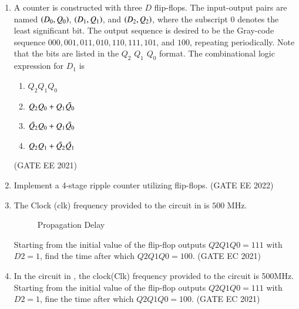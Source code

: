 \begin{enumerate}[label=\arabic*.,ref=\theenumi]
%
\item A counter is constructed with three $D$ flip-flops. The input-output pairs are named $\left(D_0, Q_0\right)$, $\left(D_1, Q_1\right)$, and $\left(D_2, Q_2\right)$, where the subscript $0$ denotes the least significant bit. The output sequence is desired to be the Gray-code sequence $000, 001, 011, 010, 110, 111, 101$, and $100$, repeating periodically. Note that the bits are listed in the $Q_2$  $Q_1$  $Q_0$ format. The combinational logic expression for $D_1$ is
%
\begin{enumerate}
    \item $Q_2 Q_1 Q_0$
    \item $Q_2 Q_0 + Q_1 \Bar{Q_0}$
    \item $\Bar{Q_2} Q_0 + Q_1 \Bar{Q_0}$
    \item $Q_2 Q_1 + \Bar{Q_2} \Bar{Q_1}$
\end{enumerate}
\hfill(GATE EE 2021)
%
\item Implement a 4-stage ripple counter utilizing flip-flops.
\label{gate-ee-2022-29}
\hfill (GATE EE 2022)
%
\item 
 The Clock (clk) frequency provided to the circuit 
in	
is $500$ MHz.
%
	\begin{figure}[H]
    \centering
    \resizebox{0.75\columnwidth}{!}{%
    
		}
    \caption{Propagation Delay}
	\label{fig:PropagationDelay}
\end{figure}
Starting from the initial value of the flip-flop outputs $Q2Q1Q0 =1 1 1$ with $D2=1$, find the time after which $Q2Q1Q0=1 0 0$. 
\hfill(GATE EC 2021)
%
\item In the circuit in 
	,
\label{prob:gate-ec-46.2021}
the clock(Clk) frequency provided to the circuit is 500MHz.
Starting from the initial value of the flip-flop outputs $Q2Q1Q0 =111$ with $D2=1$, fine the time after which $Q2Q1Q0 = 1 0 0$. 
\hfill (GATE EC 2021)
%
	\begin{figure}[H]
    \centering
\end{figure}
\end{enumerate}
